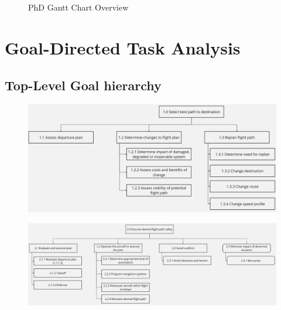 \documentclass[12pt,a4paper]{article} %
\begin{document}
\begin{landscape}
\begin{figure}[H]
\begin{center}
\begin{ganttchart}
		 \\
		 \\
		 \\
		 \\
		
		\end{ganttchart}
		\end{center}
		\caption{PhD Gantt Chart Overview}
		\label{fig:phd_gantt}
	
	\end{figure}
	\end{landscape}

	\appendix
	\section{Goal-Directed Task Analysis}
	\label{appendix:GDTA}
	\subsection{Top-Level Goal hierarchy}

	\begin{figure}[H]
		\centering
		\includegraphics[width=1.0\textwidth]{./images/GDTA/top-goal-1.jpg}
		\label{gdta:top-1}
	\end{figure}

	\begin{figure}[H]
		\centering
		\includegraphics[width=1.0\textwidth]{./images/GDTA/top-goal-2.jpg}
		\label{gdta:top-2}
	\end{figure}
\end{document}
